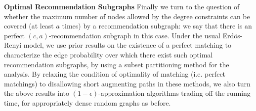 {\bf Optimal Recommendation Subgraphs}
Finally we turn to the question of whether the maximum number of nodes allowed
by the degree constraints can be covered (at least $a$ times) by a recommendation
subgraph: we say that there is an perfect $(c,a)$-recommendation subgraph in this
case. Under the usual Erd\"os-Renyi model, we use prior results on the
existence of a perfect matching to characterize the edge probability over which
there exist such optimal recommendation subgraphs, by using a subset partitioning
method for the analysis. By relaxing the condition of optimality of matching (i.e.
perfect matchings) to disallowing short augmenting paths in these methods, we also
turn the above results into $(1-\epsilon)$-approximation algorithms trading off
the running time, for appropriately dense random graphs as before. \vs

